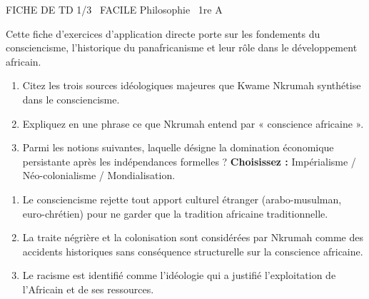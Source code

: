 \documentclass[11pt]{article}
\begin{document}
\begin{tcolorbox}[enhanced,colback=popink,colframe=popink,arc=10pt,boxrule=0pt,left=12pt,right=12pt,top=9pt,bottom=9pt]
{\color{white}\popxbold\small FICHE DE TD 1/3 \textbullet\ FACILE \hfill Philosophie \textbullet\ 1re A\par}
\end{tcolorbox}
\vspace{4pt}
Cette fiche d'exercices d'application directe porte sur les fondements du consciencisme, l'historique du panafricanisme et leur rôle dans le développement africain.

\begin{exercice}
\begin{enumerate}
    \item Citez les trois sources idéologiques majeures que Kwame Nkrumah synthétise dans le consciencisme.
    \item Expliquez en une phrase ce que Nkrumah entend par « conscience africaine ».
    \item Parmi les notions suivantes, laquelle désigne la domination économique persistante après les indépendances formelles ? \textbf{Choisissez :} Impérialisme / Néo-colonialisme / Mondialisation.
\end{enumerate}
\end{exercice}

\begin{exercice}
\begin{enumerate}
    \item Le consciencisme rejette tout apport culturel étranger (arabo-musulman, euro-chrétien) pour ne garder que la tradition africaine traditionnelle.
    \item La traite négrière et la colonisation sont considérées par Nkrumah comme des accidents historiques sans conséquence structurelle sur la conscience africaine.
    \item Le racisme est identifié comme l'idéologie qui a justifié l'exploitation de l'Africain et de ses ressources.
\end{enumerate}
\end{exercice}
\end{document}
